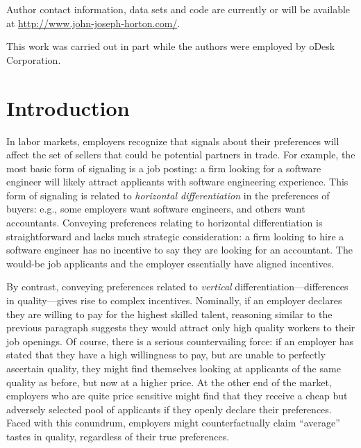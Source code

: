\documentclass[prodmode,acmec]{ec-acmsmall}
\begin{document}

\begin{bottomstuff}
Author contact information, data sets and code are currently or will
be available at \href{http://www.john-joseph-horton.com/}{http://www.john-joseph-horton.com/}.

This work was carried out in part while the authors were employed by oDesk Corporation.
\end{bottomstuff}

\maketitle


\section{Introduction}

In labor markets, employers recognize that signals about their preferences will affect the set of sellers that could be potential partners in trade.
For example, the most basic form of signaling is a job posting:
a firm looking for a software engineer will likely attract applicants with software engineering experience.
This form of signaling is related to {\em horizontal differentiation} in the preferences of buyers:
e.g., some employers want software engineers, and others want accountants.
Conveying preferences relating to horizontal differentiation is straightforward and lacks much strategic consideration:
a firm looking to hire a software engineer has no incentive to say they are looking for an accountant.
The would-be job applicants and the employer essentially have aligned incentives.

By contrast, conveying preferences related to {\em vertical} differentiation---differences in quality---gives rise to complex incentives.
Nominally, if an employer declares they are willing to pay for the highest skilled talent, reasoning similar to the previous paragraph suggests they would attract only high quality workers to their job openings.
Of course, there is a serious countervailing force:
if an employer has stated that they have a high willingness to pay, but are unable to perfectly ascertain quality, they might find themselves looking at applicants of the same quality as before, but now at a higher price.
At the other end of the market, employers who are quite price sensitive might find that they receive a cheap but adversely selected pool of applicants if they openly declare their preferences.
Faced with this conundrum, employers might counterfactually claim ``average'' tastes in quality, regardless of their true preferences.
\end{document}
